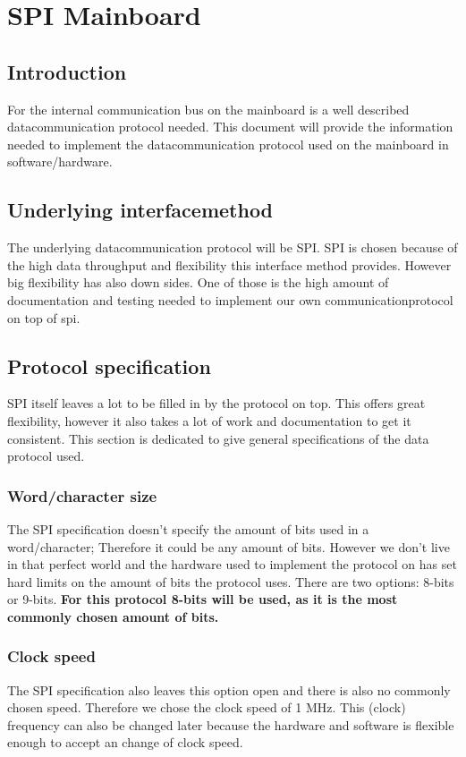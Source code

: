 \chapter{SPI Mainboard}
\section{Introduction}
For the internal communication bus on the mainboard is a well described datacommunication protocol needed. This document will provide the information needed to implement the datacommunication protocol used on the mainboard in software/hardware.

\section{Underlying interfacemethod}
The underlying datacommunication protocol will be SPI. SPI is chosen because of the high data throughput and flexibility this interface method provides. However big flexibility has also down sides. One of those is the high amount of documentation and testing needed to implement our own communicationprotocol on top of spi. \\
\pagebreak
\section{Protocol specification}
SPI itself leaves a lot to be filled in by the protocol on top. This offers great flexibility, however it also takes a lot of work and documentation to get it consistent. This section is dedicated to give general specifications of the data protocol used.
\subsection{Word/character size}
The SPI specification doesn't specify the amount of bits used in a word/character; Therefore it could be any amount of bits. However we don't live in that perfect world and the hardware used to implement the protocol on has set hard limits on the amount of bits the protocol uses.
There are two options: 8-bits or 9-bits. \textbf{For this protocol 8-bits will be used, as it is the most commonly chosen amount of bits. }
\subsection{Clock speed}
The SPI specification also leaves this option open and there is also no commonly chosen speed. Therefore we chose the clock speed of 1 MHz. This (clock) frequency can also be changed later because the hardware and software is flexible enough to accept an change of clock speed.
